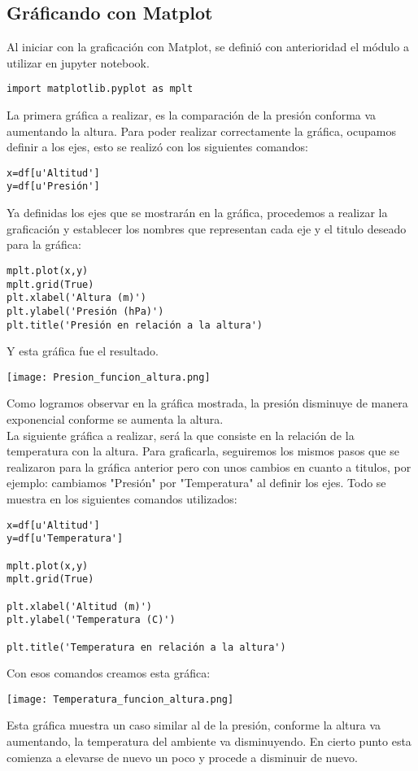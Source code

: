 \documentclass{article}
\begin{document}
\subsection{\huge Gráficando con Matplot}
Al iniciar con la graficación con Matplot, se definió con anterioridad el módulo a utilizar en jupyter notebook.
\begin{verbatim}
import matplotlib.pyplot as mplt
\end{verbatim}
La primera gráfica a realizar, es la comparación de la presión conforma va aumentando la altura. Para poder realizar correctamente la gráfica, ocupamos definir a los ejes, esto se realizó con los siguientes comandos:
\begin{verbatim}
x=df[u'Altitud']
y=df[u'Presión']
\end{verbatim}
Ya definidas los ejes que se mostrarán en la gráfica, procedemos a realizar la graficación y establecer los nombres que representan cada eje y el titulo deseado para la gráfica:
\begin{verbatim}
mplt.plot(x,y)
mplt.grid(True)
plt.xlabel('Altura (m)')
plt.ylabel('Presión (hPa)')
plt.title('Presión en relación a la altura')
\end{verbatim}
Y esta gráfica fue el resultado.\\
\begin{center}
\texttt{[image: Presion\_funcion\_altura.png]}
\end{center}
Como logramos observar en la gráfica mostrada, la presión disminuye de manera exponencial conforme se aumenta la altura.\\

La siguiente gráfica a realizar, será la que consiste en la relación de la temperatura con la altura. Para graficarla, seguiremos los mismos pasos que se realizaron para la gráfica anterior pero con unos cambios en cuanto a titulos, por ejemplo: cambiamos "Presión" por "Temperatura" al definir los ejes. Todo se muestra en los siguientes comandos utilizados:
\begin{verbatim}
x=df[u'Altitud']
y=df[u'Temperatura']

mplt.plot(x,y)
mplt.grid(True)

plt.xlabel('Altitud (m)')
plt.ylabel('Temperatura (C)')

plt.title('Temperatura en relación a la altura')
\end{verbatim}
Con esos comandos creamos esta gráfica:
\begin{center}
\texttt{[image: Temperatura\_funcion\_altura.png]}
\end{center}
Esta gráfica muestra un caso similar al de la presión, conforme la altura va aumentando, la temperatura del ambiente va disminuyendo. En cierto punto esta comienza a elevarse de nuevo un poco y procede a disminuir de nuevo.\\
\end{document}
